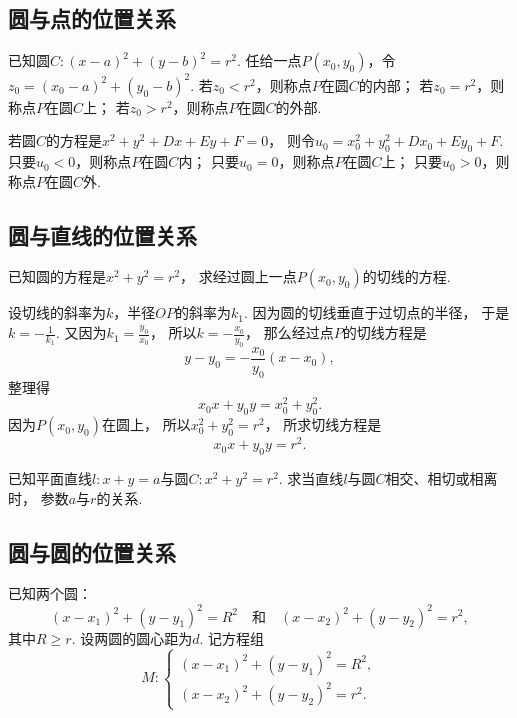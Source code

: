 \subsection{圆与点的位置关系}
已知圆\(C: (x-a)^2+(y-b)^2=r^2\).
任给一点\(P(x_0,y_0)\)，令\(z_0 = (x_0-a)^2+(y_0-b)^2\).
若\(z_0 < r^2\)，则称点\(P\)在圆\(C\)的内部；
若\(z_0 = r^2\)，则称点\(P\)在圆\(C\)上；
若\(z_0 > r^2\)，则称点\(P\)在圆\(C\)的外部.

若圆\(C\)的方程是\(x^2+y^2+Dx+Ey+F=0\)，
则令\(u_0 = x_0^2+y_0^2+Dx_0+Ey_0+F\).
只要\(u_0 < 0\)，则称点\(P\)在圆\(C\)内；
只要\(u_0 = 0\)，则称点\(P\)在圆\(C\)上；
只要\(u_0 > 0\)，则称点\(P\)在圆\(C\)外.

\subsection{圆与直线的位置关系}
\begin{example}
已知圆的方程是\(x^2+y^2 = r^2\)，
求经过圆上一点\(P(x_0,y_0)\)的切线的方程.
\begin{solution}
设切线的斜率为\(k\)，半径\(OP\)的斜率为\(k_1\).
因为圆的切线垂直于过切点的半径，
于是\(k = -\frac{1}{k_1}\).
又因为\(k_1 = \frac{y_0}{x_0}\)，
所以\(k = -\frac{x_0}{y_0}\)，
那么经过点\(P\)的切线方程是\begin{equation*}
	y-y_0 = -\frac{x_0}{y_0} (x-x_0),
\end{equation*}
整理得\begin{equation*}
	x_0 x + y_0 y = x_0^2 + y_0^2.
\end{equation*}
因为\(P(x_0,y_0)\)在圆上，
所以\(x_0^2 + y_0^2 = r^2\)，
所求切线方程是\begin{equation}
	x_0 x + y_0 y = r^2.
\end{equation}
\end{solution}
\end{example}

\begin{example}
已知平面直线\(l: x + y = a\)与圆\(C: x^2 + y^2 = r^2\).
求当直线\(l\)与圆\(C\)相交、相切或相离时，
参数\(a\)与\(r\)的关系.
\end{example}

\subsection{圆与圆的位置关系}
已知两个圆：\begin{equation*}
	(x-x_1)^2+(y-y_1)^2=R^2
	\quad\text{和}\quad
	(x-x_2)^2+(y-y_2)^2=r^2,
\end{equation*}其中\(R \geq r\).
设两圆的圆心距为\(d\).
记方程组\begin{equation*}
	M: \begin{cases}
		(x-x_1)^2+(y-y_1)^2=R^2, \\
		(x-x_2)^2+(y-y_2)^2=r^2.
	\end{cases}
\end{equation*}

